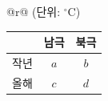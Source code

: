 \begin{tabular}{@{}r@{}}
{\footnotesize (단위: $^\circ$C)} \\[-1pt]
\begin{tabular}{|c|c|c|}
\hline
 & 남극 & 북극 \\
\hline
작년 & $a$ & $b$ \\
\hline
올해 & $c$ & $d$ \\
\hline
\end{tabular}
\end{tabular}
